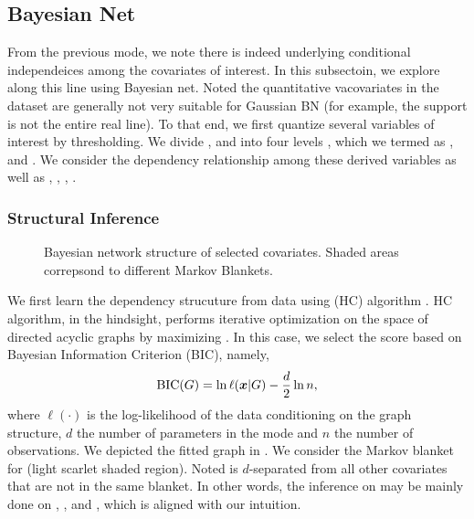 \subsection{Bayesian Net} \label{sub:bn}

	From the previous mode, we note there is indeed underlying conditional
	independeices among the covariates of interest. In this subsectoin,
	we explore along this line using Bayesian net. Noted the quantitative vacovariates in the dataset
	are generally not very suitable for Gaussian BN (for example, the support is not the entire real line).
	To that end, we first quantize several variables of interest by thresholding. We divide , 
	and  into four levels , which we termed as ,
	 and . We consider the dependency
	relationship among these derived variables as well as , , ,
	.

	\subsubsection{Structural Inference}

		\begin{figure}[htpb]
			\centering
			\def\svgwidth{0.6\textwidth}
			
			\caption{Bayesian network structure of selected covariates. Shaded areas correpsond to different Markov Blankets.}
			\label{fig:bn}
		\end{figure}

		We first learn the dependency strucuture from data using  (HC) algorithm \cite{}.
		HC algorithm, in the hindsight, performs iterative optimization on the space of directed acyclic graphs
		by maximizing . In this case, we select the score
		based on Bayesian Information Criterion (BIC), namely,
		\begin{equation} \label{eq:bn_bic}
		\begin{aligned}
			\mathrm{BIC}(G) = \ln \ell({\boldsymbol x} \vert G) - \frac{d}{2} \ln n,
		\end{aligned}
		\end{equation}
		where $\ell(\cdot)$ is the log-likelihood of the data conditioning on the graph
		structure, $d$ the number of parameters in the mode and $n$ the number of observations.
		We depicted the fitted graph in . We consider the Markov blanket
		for  (light scarlet shaded region). Noted  is $d$-separated
		from all other covariates that are not in the same blanket. In other words, the inference
		on  may be mainly done on , ,  and ,
		which is aligned with our intuition.

